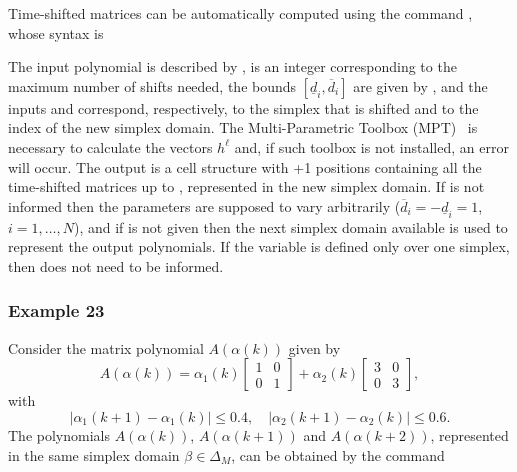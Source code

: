 \documentclass[english,11pt]{article}
\theoremstyle{break} \theorembodyfont{\small\rm}
\begin{document}
Time-shifted matrices can be automatically computed using the command , whose syntax is

\vspace{0.5cm}%
\begin{minipage}{14.5cm}
\end{minipage}
\vspace{0.2cm}

The input polynomial is described by ,  is an integer corresponding to the maximum number of
shifts needed, the bounds $[\underline{d}_i, \overline{d}_i]$ are given by , and the inputs
 and  correspond, respectively, to the simplex that is shifted and to 
the index of the new simplex domain. The Multi-Parametric Toolbox (MPT)~\cite{HKJM:13} is necessary to
calculate the vectors $h^\ell$ and, if such toolbox is not installed, an error will occur. The output
 is a cell structure with +1 positions containing all the time-shifted matrices 
up to , represented in the new simplex domain. If  is not informed then the parameters 
are supposed to vary arbitrarily ($\overline{d}_i=-\underline{d}_i=1$, $i=1,\ldots,N$), and if  is not given then the next simplex domain available is used to represent the output polynomials. If the variable is defined only over one simplex, then 
does not need to be informed.

\subsubsection*{Example 23}

Consider the matrix polynomial $A(\alpha(k))$ given by
\[
 A(\alpha(k)) = \alpha_1(k) \begin{bmatrix} 1 & 0 \\ 0 & 1 \end{bmatrix} + \alpha_2(k) \begin{bmatrix} 3 & 0 \\ 0 & 3 \end{bmatrix},
\]
with
\[
 |\alpha_1(k+1) - \alpha_1(k)| \leq 0.4, \quad  |\alpha_2(k+1) - \alpha_2(k)| \leq 0.6.
\]
The polynomials $A(\alpha(k))$, $A(\alpha(k+1))$ and $A(\alpha(k+2))$, represented in the same simplex domain $\beta \in \Delta_M$,
can be obtained by the command
\end{document}
